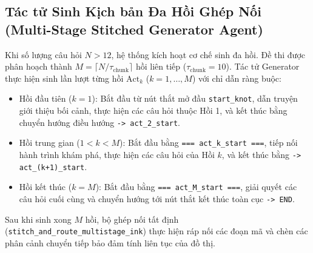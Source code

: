 \documentclass[conference]{IEEEtran}
\begin{document}
\subsection{Tác tử Sinh Kịch bản Đa Hồi Ghép Nối (Multi-Stage Stitched Generator Agent)}
Khi số lượng câu hỏi $N > 12$, hệ thống kích hoạt cơ chế sinh đa hồi. Đề thi được phân hoạch thành $M = \lceil N / \tau_{\text{chunk}} \rceil$ hồi liên tiếp ($\tau_{\text{chunk}} = 10$). Tác tử Generator thực hiện sinh lần lượt từng hồi $\text{Act}_k$ ($k = 1, \dots, M$) với chỉ dẫn ràng buộc:
\begin{itemize}
    \item Hồi đầu tiên ($k=1$): Bắt đầu từ nút thắt mở đầu \texttt{start\_knot}, dẫn truyện giới thiệu bối cảnh, thực hiện các câu hỏi thuộc Hồi 1, và kết thúc bằng chuyển hướng điều hướng \texttt{-> act\_2\_start}.
    \item Hồi trung gian ($1 < k < M$): Bắt đầu bằng \texttt{=== act\_k\_start ===}, tiếp nối hành trình khám phá, thực hiện các câu hỏi của Hồi $k$, và kết thúc bằng \texttt{-> act\_(k+1)\_start}.
    \item Hồi kết thúc ($k=M$): Bắt đầu bằng \texttt{=== act\_M\_start ===}, giải quyết các câu hỏi cuối cùng và chuyển hướng tới nút thắt kết thúc toàn cục \texttt{-> END}.
\end{itemize}
Sau khi sinh xong $M$ hồi, bộ ghép nối tất định (\texttt{stitch\_and\_route\_multistage\_ink}) thực hiện ráp nối các đoạn mã và chèn các phân cảnh chuyển tiếp bảo đảm tính liên tục của đồ thị.
\end{document}
